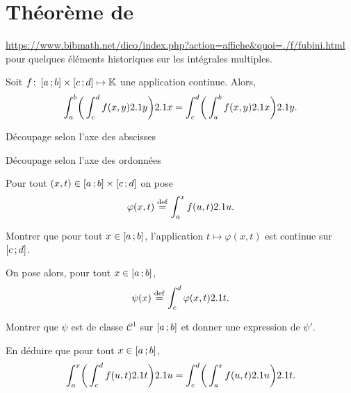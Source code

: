 \section{Théorème de }

\url{https://www.bibmath.net/dico/index.php?action=affiche&quoi=./f/fubini.html} pour quelques éléments historiques sur les intégrales multiples. 


\begin{theo}
    Soit $\fonctionligne[f]{\interff{a}{b} \times \interff{c}{d}}{\K}$ une application continue. Alors,
    \[
    \int_{a}^{b} \mathopen{}\bigg( \int_{c}^{d} f(x,y) \d y \bigg) \d x = \int_{c}^{d} \mathopen{}\bigg( \int_{a}^{b} f(x,y) \d x \bigg) \d y.
    \]
\end{theo}

\begin{marginfigure}[0cm]
    \centering
    
    \caption{Découpage selon l'axe des abscisses}
\end{marginfigure}
\begin{marginfigure}[5cm]
    \centering
    
    \caption{Découpage selon l'axe des ordonnées}
\end{marginfigure}

\begin{exercice}
    Pour tout $(x, t) \in \interff{a}{b} \times \interff{c}{d}$ on pose 
    $$\varphi(x, t) \defeq \int_{a}^{x} f(u, t) \d u.$$
    \begin{questions}
    \item Montrer que pour tout $x \in \interff{a}{b}$, l'application $t \mapsto \varphi(x, t)$ est continue sur $\interff{c}{d}$.
    \end{questions}

    On pose alors, pour tout $x  \in \interff{a}{b}$,
    $$\psi(x) \defeq \int_{c}^{d} \varphi(x, t) \d t.$$
    \begin{questions}[resume]
        \item Montrer que $\psi$ est de classe $\mathscr{C}^1$ sur $\interff{a}{b}$ et donner une expression de $\psi'$.
        \item En déduire que pour tout $x \in \interff{a}{b}$,
        \[
        \int_{a}^{x} \mathopen{}\bigg( \int_{c}^{d} f(u,t) \d t \bigg) \d u = \int_{c}^{d} \mathopen{}\bigg( \int_{a}^{x} f(u,t) \d u \bigg) \d t.
        \]
    \end{questions}
\end{exercice}

